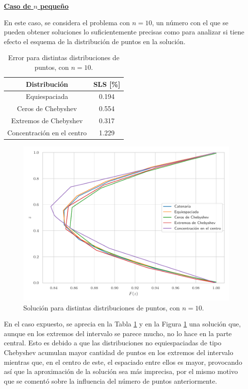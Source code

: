 \underline{\textbf{Caso de $n$ pequeño}}

En este caso, se considera el problema con $n = 10$, un número con el que se pueden obtener soluciones lo suficientemente precisas como para analizar si tiene efecto el esquema de la distribución de puntos en la solución.

\begin{table}[h]
    \centering
    \caption{Error para distintas distribuciones de puntos, con $n = 10$.}
    \begin{tabular}{c c}
        \hline
        \textbf{Distribución} & \textbf{SLS [\%]} \\ \hline \hline
        Equiespaciada              & 0.194 \\ \hline
        Ceros de Chebyshev         & 0.554 \\ \hline
        Extremos de Chebyshev      & 0.317 \\ \hline 
        Concentración en el centro & 1.229 \\ \hline
    \end{tabular}
    \label{tab:erorr_distrib_n10}
\end{table}

\begin{figure}[h]
    \centering
    \includegraphics[width = 0.6 \linewidth]{Figures/01/sol_distrib_n10.pdf}
    \caption{Solución para distintas distribuciones de puntos, con $n = 10$.}
    \label{fig:sol_distrib_n10}
\end{figure}

En el caso expuesto, se aprecia en la Tabla \ref{tab:erorr_distrib_n10} y en la Figura \ref{fig:sol_distrib_n10} una solución que, aunque en los extremos del intervalo se parece mucho, no lo hace en la parte central. Esto es debido a que las distribuciones no equiespaciadas de tipo Chebyshev acumulan mayor cantidad de puntos en los extremos del intervalo mientras que, en el centro de este, el espaciado entre ellos es mayor, provocando así que la aproximación de la solución sea más imprecisa, por el mismo motivo que se comentó sobre la influencia del número de puntos anteriormente. 

